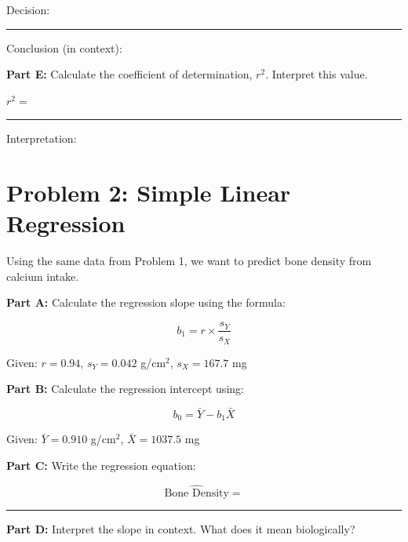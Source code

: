 \documentclass[11pt]{article}
\begin{document}
Decision: \rule{8cm}{0.4pt}

\vspace{0.5cm}

Conclusion (in context):

\vspace{2cm}

\textbf{Part E:} Calculate the coefficient of determination, $r^2$. Interpret this value.

\vspace{0.3cm}

$r^2 = $ \rule{3cm}{0.4pt}

\vspace{0.3cm}

Interpretation:

\vspace{2cm}

\newpage

\section{Problem 2: Simple Linear Regression}

Using the same data from Problem 1, we want to predict bone density from calcium intake.

\vspace{0.3cm}

\textbf{Part A:} Calculate the regression slope using the formula:

$$b_1 = r \times \frac{s_Y}{s_X}$$

Given: $r = 0.94$, $s_Y = 0.042$ g/cm$^2$, $s_X = 167.7$ mg

\vspace{3cm}

\textbf{Part B:} Calculate the regression intercept using:

$$b_0 = \bar{Y} - b_1 \bar{X}$$

Given: $\bar{Y} = 0.910$ g/cm$^2$, $\bar{X} = 1037.5$ mg

\vspace{3cm}

\textbf{Part C:} Write the regression equation:

$$\widehat{\text{Bone Density}} = $$ \rule{8cm}{0.4pt}

\vspace{1cm}

\textbf{Part D:} Interpret the slope in context. What does it mean biologically?

\vspace{3cm}
\end{document}
